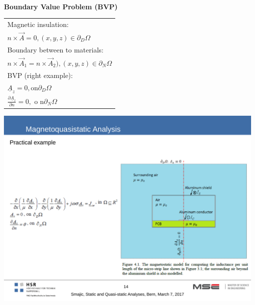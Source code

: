 \textbf{\\ Boundary Value Problem (BVP)\\}
\begin{minipage}[lt]{11cm}
	\begin{tabular}{l}
		Magnetic insulation: \\
		\(\displaystyle n \times \vec{A} = 0,(x,y,z)\in \partial_D\Omega\)\\
		Boundary between to materials: \\
		\(\displaystyle n \times \vec{A}_1 = n \times \vec{A}_2), (x,y,z) \in \partial_N\Omega \) \\
		BVP (right example): \\
		\(\displaystyle \underline{A}_z = 0, \mathrm{ on } \partial_D\Omega \) \\
		\(\displaystyle \frac{\partial \underline{A}_z}{\partial n} = 0, \textrm{ o n} \partial_N\Omega \)
	\end{tabular}
\end{minipage}
\begin{minipage}[rt]{8cm}
	\includegraphics[width=.8\textwidth]{./images/BVP_magnetosquasistatic.pdf}
\end{minipage}